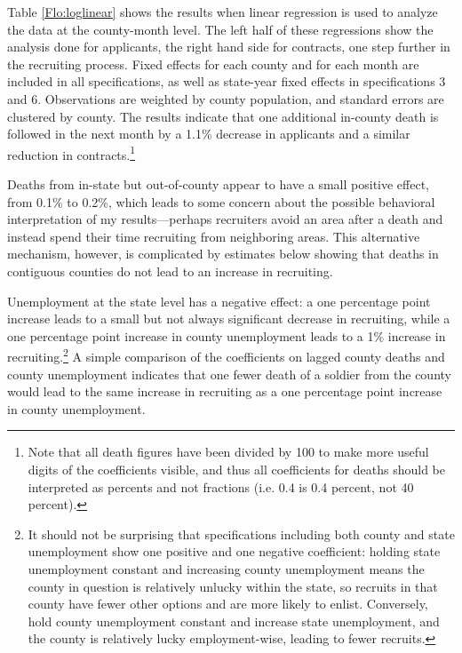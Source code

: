\documentclass[12pt] {article}
\begin{document}
Table \ref{Flo:loglinear}
shows the results when linear regression is used to analyze the data
at the county-month level. The left half of these regressions show the analysis done for applicants, the right hand side for contracts, one step further in the recruiting
process. %
Fixed effects for each county and for each month are included in all specifications, as well as state-year fixed effects  in specifications 3 and 6.
Observations are weighted by county population, and standard errors
are clustered by county. The results indicate that one additional
in-county death is followed in the next month by a 1.1\%
decrease in applicants and a similar reduction in contracts.\footnote{Note that all death figures have been divided by 100 to make more
useful digits of the coefficients visible, and thus all coefficients
for deaths should be interpreted as percents and not fractions (i.e.
0.4 is 0.4 percent, not 40 percent).} 

Deaths from in-state but out-of-county
appear to have a small positive effect, from 0.1\% to 0.2\%, which leads to some concern about the possible behavioral interpretation of my results---perhaps recruiters avoid an area after a death and instead spend their time recruiting from neighboring areas. This alternative mechanism, however, is complicated by estimates below showing that deaths in contiguous counties do not lead to an increase in recruiting. 

Unemployment at the state level has a negative effect: a one percentage point increase leads to a small but not always significant decrease in recruiting,
while a one percentage point increase in county unemployment leads
to a 1\% increase in recruiting.\footnote{It should not be surprising that specifications including both county and state unemployment show one positive and one negative coefficient: holding state unemployment constant and increasing county unemployment means the county in question is relatively unlucky within the state, so recruits in that county have fewer other options and are more likely to enlist. Conversely, hold county unemployment constant and increase state unemployment, and the county is relatively lucky employment-wise, leading to fewer recruits.}  A simple comparison of the coefficients on lagged county deaths and county unemployment indicates that one fewer death of a soldier from the county would lead to the same increase in recruiting as a one percentage point increase in county unemployment.
\end{document}
